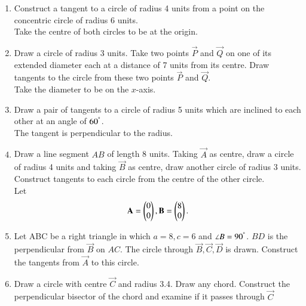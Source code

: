 \documentclass[journal,12pt,twocolumn]{IEEEtran}
\renewcommand\thesection{\arabic{section}}
\begin{document}
\begin{enumerate}[label=\thesection.\arabic*
,ref=\thesection.\theenumi]
\item Construct a tangent to a circle of radius 4 units from a point on the concentric circle of radius 6 
units.
\\
\solution Take the centre of both circles to be at the origin.  
\item Draw a circle of radius 3 units. Take  two points $\vec{P}$ and $\vec{Q}$ on one of its extended 
diameter each at a distance of 7 units from its centre. Draw tangents to the circle from these two points 
$\vec{P}$ and $\vec{Q}$.
\\
\solution Take the diameter to be on the $x$-axis.
\item Draw a pair of tangents to a circle of radius 5 units which are inclined to each other at an angle of 
$60^{\degree}$.
\\
\solution The tangent is perpendicular to the radius.
\item Draw a line segment $AB$ of length 8 units. Taking $\vec{A}$ as centre, draw a circle of radius 4 units 
and taking $\vec{B}$ as centre, draw another circle of radius 3 units. Construct tangents to each circle from 
the centre of the other circle.
\\
\solution Let
\begin{align}
\mathbf{A} = \begin{pmatrix}0 \\ 0\end{pmatrix}, \mathbf{B} = \begin{pmatrix}8 \\ 0\end{pmatrix}.
\end{align}
\item Let ABC be a right triangle in which $a = 8, c = 6$ and $\angle B = 90^{\degree}$.  $BD$ is the 
perpendicular from $\vec{B}$ on $AC$. The circle through $\vec{B}, \vec{C}, \vec{D}$ is drawn.  Construct the 
tangents from $\vec{A}$ to this circle.
\item Draw a circle with centre $\vec{C}$ and radius 3.4.  Draw any chord.  Construct the perpendicular bisector of the chord and examine if it passes through $\vec{C}$\end{enumerate}
\end{document}
